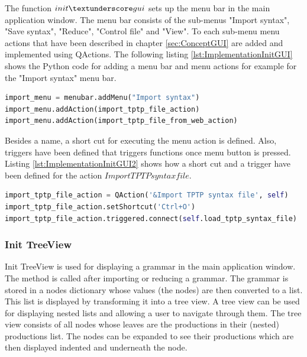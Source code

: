 The function $init\textunderscore gui$ sets up the menu bar in the main application window. The menu bar consists of the sub-menus "Import syntax", "Save syntax", "Reduce", "Control file" and "View". To each sub-menu menu actions that have been described in chapter \ref{sec:ConceptGUI} are added and implemented using QActions. The following listing \ref{lst:ImplementationInitGUI} shows the Python code for adding a menu bar and menu actions for example for the "Import syntax" menu bar.

\begin{lstlisting}[language=Python, basicstyle=\scriptsize	,caption= Implementation of menu bar,label= lst:ImplementationInitGUI]
import_menu = menubar.addMenu("Import syntax")
import_menu.addAction(import_tptp_file_action)
import_menu.addAction(import_tptp_file_from_web_action)
\end{lstlisting}

Besides a name, a short cut for executing the menu action is defined. Also, triggers have been defined that triggers functions once menu button is pressed. Listing \ref{lst:ImplementationInitGUI2} shows how a short cut and a trigger have been defined for the action $Import TPTP syntax file$.

\begin{lstlisting}[language=Python, basicstyle=\scriptsize	,caption= Implementation of menu actions,label= lst:ImplementationInitGUI2]
import_tptp_file_action = QAction('&Import TPTP syntax file', self)
import_tptp_file_action.setShortcut('Ctrl+O')
import_tptp_file_action.triggered.connect(self.load_tptp_syntax_file)
\end{lstlisting}


\subsubsection{Init TreeView}\label{sec:ImplementationGUIInitTreeView}
Init TreeView is used for displaying a grammar in the main application window. The method is called after importing or reducing a grammar. The grammar is stored in a nodes dictionary whose values (the nodes) are then converted to a list. This list is displayed by transforming it into a tree view. A tree view can be used for displaying nested lists and allowing a user to navigate through them. The tree view consists of all nodes whose leaves are the productions in their (nested) productions list. The nodes can be expanded to see their productions which are then displayed indented and underneath the node.

